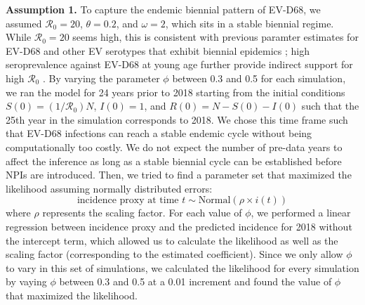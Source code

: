 \documentclass[12pt]{article}
\begin{document}
\textbf{Assumption 1.} To capture the endemic biennial pattern of EV-D68, we assumed $\mathcal R_0 = 20$, $\theta=0.2$, and $\omega = 2$, which sits in a stable biennial regime.
While $\mathcal R_0 = 20$ seems high, this is consistent with previous paramter estimates for EV-D68 and other EV serotypes that exhibit biennial epidemics \citep{pons2018serotype,park2021epidemiological};
high seroprevalence against EV-D68 at young age further provide indirect support for high $\mathcal R_0$ \citep{livingston2022neutralizing}.
By varying the parameter $\phi$ between 0.3 and 0.5 for each simulation, we ran the model for 24 years prior to 2018 starting from the initial conditions $S(0) = (1/\mathcal R_0)N$, $I(0) = 1$, and $R(0) = N - S(0) - I(0)$ such that the 25th year in the simulation corresponds to 2018.
We chose this time frame such that EV-D68 infections can reach a stable endemic cycle without being computationally too costly. We do not expect the number of pre-data years to affect the inference as long as a stable biennial cycle can be established before NPIs are introduced.
Then, we tried to find a parameter set that maximized the likelihood assuming normally distributed errors:
\begin{equation}
\textrm{incidence proxy at time }t \sim \mathrm{Normal}(\rho \times i(t))
\end{equation}
where $\rho$ represents the scaling factor.
For each value of $\phi$, we performed a linear regression between incidence proxy and the predicted incidence for 2018 without the intercept term, which allowed us to calculate the likelihood as well as the scaling factor (corresponding to the estimated coefficient).
Since we only allow $\phi$ to vary in this set of simulations, we calculated the likelihood for every simulation by vaying $\phi$ between 0.3 and 0.5 at a 0.01 increment and found the value of $\phi$ that maximized the likelihood.
\end{document}
